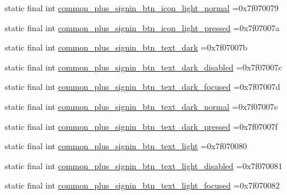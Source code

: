 \begin{DoxyCompactItemize}
\item 
static final int \mbox{\hyperlink{classbr_1_1unb_1_1cic_1_1mp_1_1marketmaster_1_1test_1_1R_1_1drawable_a0e11b2c215ec13f0ebc050de34f017dc}{common\+\_\+plus\+\_\+signin\+\_\+btn\+\_\+icon\+\_\+light\+\_\+normal}} =0x7f070079
\item 
static final int \mbox{\hyperlink{classbr_1_1unb_1_1cic_1_1mp_1_1marketmaster_1_1test_1_1R_1_1drawable_a748457b8868101e71c0cd44d61a706be}{common\+\_\+plus\+\_\+signin\+\_\+btn\+\_\+icon\+\_\+light\+\_\+pressed}} =0x7f07007a
\item 
static final int \mbox{\hyperlink{classbr_1_1unb_1_1cic_1_1mp_1_1marketmaster_1_1test_1_1R_1_1drawable_abe16f61598d5e42abce79f0a083d485c}{common\+\_\+plus\+\_\+signin\+\_\+btn\+\_\+text\+\_\+dark}} =0x7f07007b
\item 
static final int \mbox{\hyperlink{classbr_1_1unb_1_1cic_1_1mp_1_1marketmaster_1_1test_1_1R_1_1drawable_aa1be569829c6f895e3e489f4647bac4d}{common\+\_\+plus\+\_\+signin\+\_\+btn\+\_\+text\+\_\+dark\+\_\+disabled}} =0x7f07007c
\item 
static final int \mbox{\hyperlink{classbr_1_1unb_1_1cic_1_1mp_1_1marketmaster_1_1test_1_1R_1_1drawable_abe477c5ff53f8f1117a144494c382d98}{common\+\_\+plus\+\_\+signin\+\_\+btn\+\_\+text\+\_\+dark\+\_\+focused}} =0x7f07007d
\item 
static final int \mbox{\hyperlink{classbr_1_1unb_1_1cic_1_1mp_1_1marketmaster_1_1test_1_1R_1_1drawable_a24f54eb1d5dc97dc8214b3b1e33ad790}{common\+\_\+plus\+\_\+signin\+\_\+btn\+\_\+text\+\_\+dark\+\_\+normal}} =0x7f07007e
\item 
static final int \mbox{\hyperlink{classbr_1_1unb_1_1cic_1_1mp_1_1marketmaster_1_1test_1_1R_1_1drawable_a9bbe355c986d6ea33087a1c9fbc7e39a}{common\+\_\+plus\+\_\+signin\+\_\+btn\+\_\+text\+\_\+dark\+\_\+pressed}} =0x7f07007f
\item 
static final int \mbox{\hyperlink{classbr_1_1unb_1_1cic_1_1mp_1_1marketmaster_1_1test_1_1R_1_1drawable_a63975cd7e2471376ab01f57985597560}{common\+\_\+plus\+\_\+signin\+\_\+btn\+\_\+text\+\_\+light}} =0x7f070080
\item 
static final int \mbox{\hyperlink{classbr_1_1unb_1_1cic_1_1mp_1_1marketmaster_1_1test_1_1R_1_1drawable_a089fe020c6232dc4a3f901b47db1df66}{common\+\_\+plus\+\_\+signin\+\_\+btn\+\_\+text\+\_\+light\+\_\+disabled}} =0x7f070081
\item 
static final int \mbox{\hyperlink{classbr_1_1unb_1_1cic_1_1mp_1_1marketmaster_1_1test_1_1R_1_1drawable_aa98bd08d73f93e47ea0f5e061fec703a}{common\+\_\+plus\+\_\+signin\+\_\+btn\+\_\+text\+\_\+light\+\_\+focused}} =0x7f070082

\end{DoxyCompactItemize}
